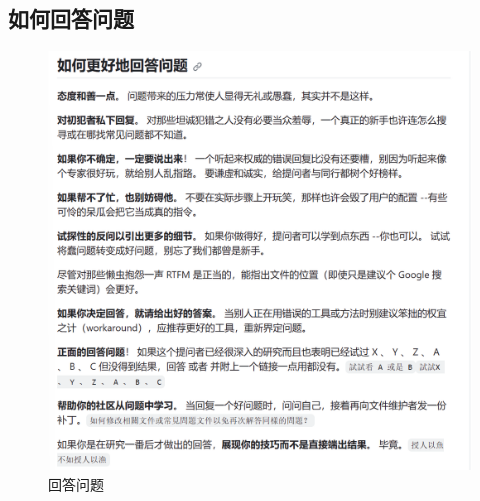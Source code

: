 \documentclass{article}
\begin{document}
  \subsection{如何回答问题}
  \begin{figure}[h]
    \centering
    \includegraphics[width=18cm]{image7.png}
    \caption{回答问题}
    \label{fig:enter-label}
\end{figure}
  
\end{document}
